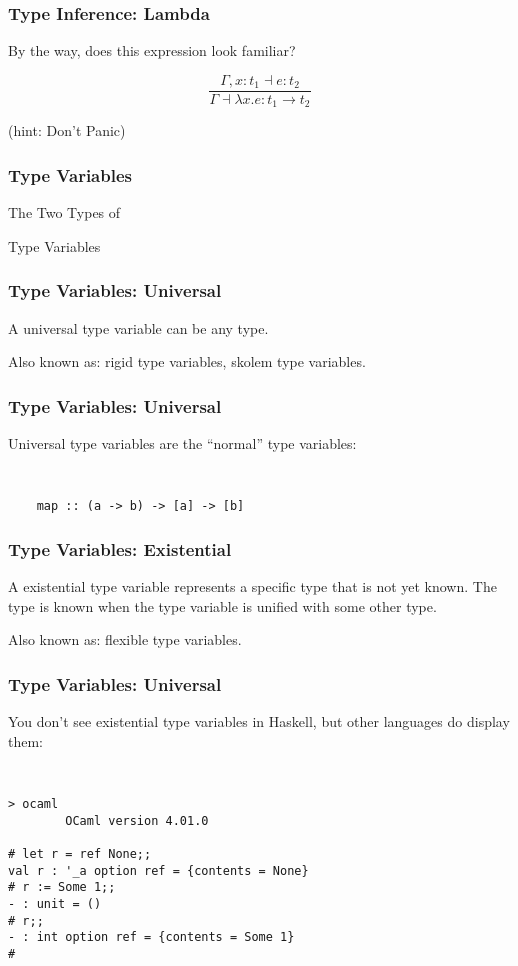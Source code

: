 \documentclass{beamer}
\begin{document}
\begin{frame}
\frametitle{Type Inference: Lambda}
By the way, does this expression look familiar?

{\Huge
$$\frac{\Gamma,x:t_1\dashv{}e:t_2}{\Gamma\dashv{}\lambda{}x.e:t_1\rightarrow{}t_2}$$
}

\vspace{40pt}

(hint: Don't Panic)
\end{frame}

\begin{frame}
\frametitle{Type Variables}
\begin{center}
\Huge{
The Two Types of

Type Variables
}
\end{center}
\end{frame}

\begin{frame}
\frametitle{Type Variables: Universal}
\Large{
\begin{definition}
A \alert{universal} type variable can be any type.

Also known as: rigid type variables, skolem type variables.
\end{definition}
}
\end{frame}

\begin{frame}[fragile]
\frametitle{Type Variables: Universal}
\Large{
\begin{center}
Universal type variables are the ``normal'' type variables:
\end{center}

{\tt
\begin{verbatim}
    map :: (a -> b) -> [a] -> [b]
\end{verbatim}
}

}
\end{frame}

\begin{frame}
\frametitle{Type Variables: Existential}
\Large{
\begin{definition}
A \alert{existential} type variable represents a specific type that is
not yet known.  The type is known when the type variable is unified with
some other type.

Also known as: flexible type variables.

\end{definition}
}
\end{frame}

\begin{frame}[fragile]
\frametitle{Type Variables: Universal}
\large{
\begin{center}
You don't see existential type variables in Haskell, but other languages
do display them:
\end{center}

{\tt
\begin{verbatim}
> ocaml
        OCaml version 4.01.0

# let r = ref None;;
val r : '_a option ref = {contents = None}
# r := Some 1;;
- : unit = ()
# r;;
- : int option ref = {contents = Some 1}
# 
\end{verbatim}
}

}
\end{frame}
\end{document}
